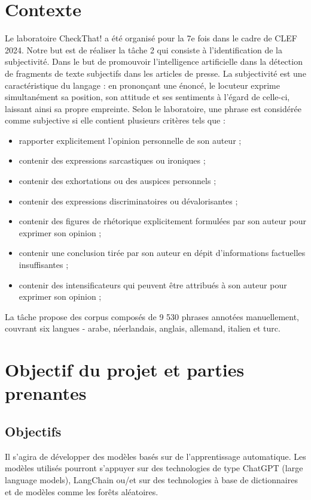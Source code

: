 \documentclass[11pt]{rapport_class}
\begin{document}
\chapter{Contexte}
Le laboratoire CheckThat! a été organisé pour la 7e fois dans le cadre de CLEF 2024. Notre but est de réaliser la tâche 2 qui consiste à l’identification de la subjectivité. Dans le but de promouvoir l’intelligence artificielle dans la détection de fragments de texte subjectifs dans les articles de presse. La subjectivité est une caractéristique du langage : en prononçant une énoncé, le locuteur exprime simultanément sa position, son attitude et ses sentiments à l'égard de celle-ci, laissant ainsi sa propre empreinte. Selon le laboratoire, une phrase est considérée comme subjective si elle contient plusieurs critères tels que :
\begin{itemize}
    \item rapporter explicitement l'opinion personnelle de son auteur ;
    \item contenir des expressions sarcastiques ou ironiques ;
    \item contenir des exhortations ou des auspices personnels ;
    \item contenir des expressions discriminatoires ou dévalorisantes ;
    \item contenir des figures de rhétorique explicitement formulées par son auteur pour exprimer son opinion ;
    \item contenir une conclusion tirée par son auteur en dépit d'informations factuelles insuffisantes ;
    \item contenir des intensificateurs qui peuvent être attribués à son auteur pour exprimer son opinion ;
\end{itemize}
La tâche propose des corpus composés de 9 530 phrases annotées manuellement, couvrant six langues - arabe, néerlandais, anglais, allemand, italien et turc.

\chapter{Objectif du projet et parties prenantes}
\section{Objectifs}
Il s'agira de développer des modèles basés sur de l'apprentissage automatique. Les modèles utilisés pourront s’appuyer sur des technologies de type ChatGPT (large language models), LangChain ou/et sur des technologies à base de dictionnaires et de modèles comme les forêts aléatoires.
\end{document}
